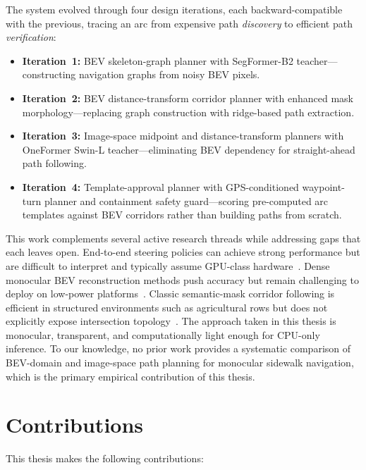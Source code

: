 \documentclass[12pt,letterpaper,oneside]{report}
\begin{document}
The system evolved through four design iterations, each backward-compatible with the previous, tracing an arc from expensive path \emph{discovery} to efficient path \emph{verification}:
\begin{itemize}[nosep]
  \item \textbf{Iteration~1:} BEV skeleton-graph planner with SegFormer-B2 teacher---constructing navigation graphs from noisy BEV pixels.
  \item \textbf{Iteration~2:} BEV distance-transform corridor planner with enhanced mask morphology---replacing graph construction with ridge-based path extraction.
  \item \textbf{Iteration~3:} Image-space midpoint and distance-transform planners with OneFormer Swin-L teacher---eliminating BEV dependency for straight-ahead path following.
  \item \textbf{Iteration~4:} Template-approval planner with GPS-conditioned waypoint-turn planner and containment safety guard---scoring pre-computed arc templates against BEV corridors rather than building paths from scratch.
\end{itemize}

This work complements several active research threads while addressing gaps that each leaves open. End-to-end steering policies can achieve strong performance but are difficult to interpret and typically assume GPU-class hardware~\cite{e2e_nav_policies, viteri2024}. Dense monocular BEV reconstruction methods push accuracy but remain challenging to deploy on low-power platforms~\cite{zhao2024bev}. Classic semantic-mask corridor following is efficient in structured environments such as agricultural rows but does not explicitly expose intersection topology~\cite{orchard_seg_nav, row_nav_survey}. The approach taken in this thesis is monocular, transparent, and computationally light enough for CPU-only inference. To our knowledge, no prior work provides a systematic comparison of BEV-domain and image-space path planning for monocular sidewalk navigation, which is the primary empirical contribution of this thesis.


\section{Contributions}

This thesis makes the following contributions:
\end{document}
